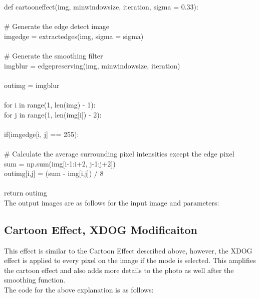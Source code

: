 \documentclass{article}
\begin{document}
	\noindent def cartoon\textunderscore effect(img, min\textunderscore window\textunderscore size, iteration, sigma = 0.33):\\
	\\
	\indent \# Generate the edge detect image\\
	\indent img\textunderscore edge = extract\textunderscore edges(img, sigma = sigma)\\
	\\
	\indent \# Generate the smoothing filter\\
	\indent img\textunderscore blur = edge\textunderscore preserving(img, min\textunderscore window\textunderscore size, iteration)\\
	\\
	\indent out\textunderscore img = img\textunderscore blur\\
	\\
	\indent for i in range(1, len(img) - 1):\\
	\indent \indent for j in range(1, len(img[i]) - 2):\\
	\\
	\indent \indent \indent if(img\textunderscore edge[i, j] == 255):\\
	\\
	\indent \indent \indent \indent \# Calculate the average surrounding pixel intensities except the edge pixel\\
	\indent \indent \indent \indent sum = np.sum(img[i-1:i+2, j-1:j+2])\\
	\indent \indent \indent \indent out\textunderscore img[i,j] = (sum - img[i,j]) / 8\\
	\\
	\indent return out\textunderscore img\\

	The output images are as follows for the input image and parameters:\\

	\subsection{Cartoon Effect, XDOG Modificaiton}
	
	This effect is similar to the Cartoon Effect described above, however, the XDOG effect is applied to every pixel on the image if the mode is selected. This amplifies the cartoon effect and also adds more details to the photo as well after the smoothing function.\\
	
	The code for the above explanation is as follows:\\
	
\end{document}

